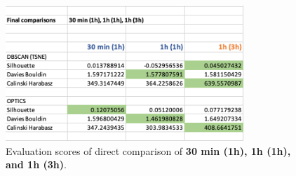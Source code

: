 \begin{figure}[H]
  \centering
  \includegraphics[width=0.8\textwidth]{./images/clusteringResults/clusteringResultsPlaces2.png}
  \caption{Evaluation scores of direct comparison of \textbf{30 min (1h), 1h (1h), and 1h (3h)}.}
  \label{figure:clusterResultsPlaces2}
\end{figure}


\clearpage
